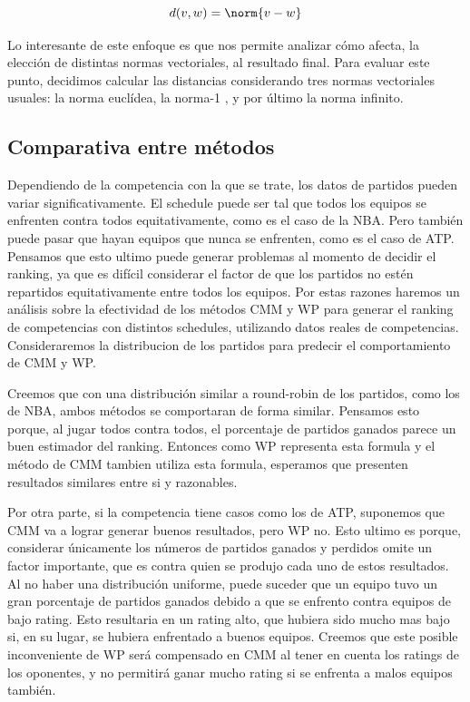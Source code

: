 \documentclass[a4paper]{article}
\begin{document}
\[d(v,w) = \norm{v-w}\]

Lo interesante de este enfoque es que nos permite analizar cómo afecta, la elección de distintas normas vectoriales, al resultado final. Para evaluar este punto, decidimos calcular las distancias considerando tres normas vectoriales usuales: la norma euclídea, la norma-1 , y por último la norma infinito.

\subsection{Comparativa entre métodos}

Dependiendo de la competencia con la que se trate, los datos de partidos pueden variar significativamente. El schedule puede ser tal que todos los equipos se enfrenten contra todos equitativamente, como es el caso de la NBA. Pero también puede pasar que hayan equipos que nunca se enfrenten, como es el caso de ATP. Pensamos que esto ultimo puede generar problemas al momento de decidir el ranking, ya que es difícil considerar el factor de que los partidos no estén repartidos equitativamente entre todos los equipos. Por estas razones haremos un análisis sobre la efectividad de los métodos CMM y WP para generar el ranking de competencias con distintos schedules, utilizando datos reales de competencias. Consideraremos la distribucion de los partidos para predecir el comportamiento de CMM y WP.

Creemos que con una distribución similar a round-robin de los partidos, como los de NBA, ambos métodos se comportaran de forma similar. Pensamos esto porque, al jugar todos contra todos, el porcentaje de partidos ganados parece un buen estimador del ranking. Entonces como WP representa esta formula y el método de CMM tambien utiliza esta formula, esperamos que presenten resultados similares entre si y razonables.

Por otra parte, si la competencia tiene casos como los de ATP, suponemos que CMM va a lograr generar buenos resultados, pero WP no. Esto ultimo es porque, considerar únicamente los números de partidos ganados y perdidos omite un factor importante, que es contra quien se produjo cada uno de estos resultados. Al no haber una distribución uniforme, puede suceder que un equipo tuvo un gran porcentaje de partidos ganados debido a que se enfrento contra equipos de bajo rating. Esto resultaria en un rating alto, que hubiera sido mucho mas bajo si, en su lugar, se hubiera enfrentado a buenos equipos. Creemos que este posible inconveniente de WP será compensado en CMM al tener en cuenta los ratings de los oponentes, y no permitirá ganar mucho rating si se enfrenta a malos equipos también.
\end{document}

